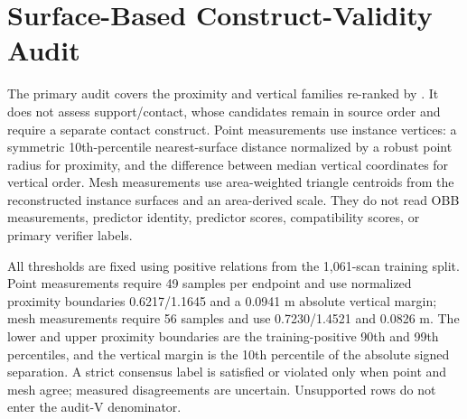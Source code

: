 \section{Surface-Based Construct-Validity Audit}

The primary audit covers the proximity and vertical families re-ranked by
\method{}. It does not assess support/contact, whose candidates remain in source
order and require a separate contact construct. Point measurements use instance
vertices: a symmetric 10th-percentile nearest-surface distance normalized by a
robust point radius for proximity, and the difference between median vertical
coordinates for vertical order. Mesh measurements use area-weighted triangle
centroids from the reconstructed instance surfaces and an area-derived scale.
They do not read OBB measurements, predictor identity, predictor scores,
compatibility scores, or primary verifier labels.

All thresholds are fixed using positive relations from the 1,061-scan training
split. Point measurements require 49 samples per endpoint and use normalized
proximity boundaries 0.6217/1.1645 and a 0.0941 m absolute vertical margin;
mesh measurements require 56 samples and use 0.7230/1.4521 and 0.0826 m. The
lower and upper proximity boundaries are the training-positive 90th and 99th
percentiles, and the vertical margin is the 10th percentile of the absolute
signed separation. A strict consensus label is satisfied or violated only when
point and mesh agree; measured disagreements are uncertain. Unsupported rows
do not enter the audit-V denominator.

